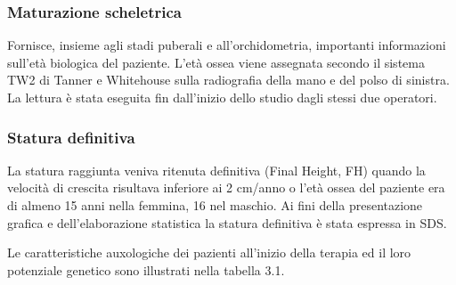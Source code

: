 \subsubsection*{Maturazione scheletrica}
Fornisce, insieme agli stadi puberali e all'orchidometria, importanti informazioni sull'età biologica del paziente. L'età ossea viene assegnata secondo il sistema TW2 di Tanner e Whitehouse\cite{tanner1983assessment} sulla radiografia della mano e del polso di sinistra. La lettura è stata eseguita fin dall'inizio dello studio dagli stessi due operatori.


\subsubsection*{Statura definitiva}
La statura raggiunta veniva ritenuta definitiva (Final Height, FH) quando la velocità di crescita risultava inferiore ai 2 cm/anno o l'età ossea del paziente era di almeno 15 anni nella femmina, 16 nel maschio.
Ai fini della presentazione grafica e dell'elaborazione statistica la statura definitiva è stata espressa in SDS.


Le caratteristiche auxologiche dei pazienti all'inizio della terapia ed il loro potenziale genetico sono illustrati nella tabella 3.1. 

